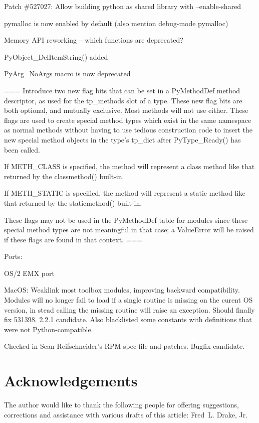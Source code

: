 \documentclass{howto}
\begin{document}
Patch \#527027: Allow building python as shared library with
--enable-shared

pymalloc is now enabled by default (also mention debug-mode pymalloc)

Memory API reworking -- which functions are deprecated?  

PyObject_DelItemString() added

PyArg_NoArgs macro is now deprecated

===
Introduce two new flag bits that can be set in a PyMethodDef method
descriptor, as used for the tp_methods slot of a type.  These new flag
bits are both optional, and mutually exclusive.  Most methods will not
use either.  These flags are used to create special method types which
exist in the same namespace as normal methods without having to use
tedious construction code to insert the new special method objects in
the type's tp_dict after PyType_Ready() has been called.

If METH_CLASS is specified, the method will represent a class method
like that returned by the classmethod() built-in.

If METH_STATIC is specified, the method will represent a static method
like that returned by the staticmethod() built-in.

These flags may not be used in the PyMethodDef table for modules since
these special method types are not meaningful in that case; a
ValueError will be raised if these flags are found in that context.
===

Ports:

OS/2 EMX port

MacOS: Weaklink most toolbox modules, improving backward
compatibility. Modules will no longer fail to load if a single routine
is missing on the curent OS version, in stead calling the missing
routine will raise an exception.  Should finally fix 531398. 2.2.1
candidate.  Also blacklisted some constants with definitions that
were not Python-compatible.

Checked in Sean Reifschneider's RPM spec file and patches.  Bugfix candidate.


\section{Acknowledgements \label{acks}}

The author would like to thank the following people for offering
suggestions, corrections and assistance with various drafts of this
article: Fred~L. Drake, Jr.
\end{document}
